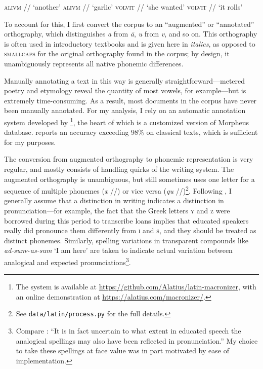\documentclass[12pt,twoside]{article}
\newcommand{\ipa}[1]{/\textipa{#1}/}
\begin{document}

\begin{exe}
\ex \textsc{alivm} \ipa{a.li.um} `another'
\ex \textsc{alivm} \ipa{a:.li.um} `garlic'
\ex \textsc{volvit} \ipa{wo.lu.it} `she wanted'
\ex \textsc{volvit} \ipa{wol.wit} `it rolls'
\end{exe}

To account for this, I first convert the corpus to an ``augmented'' or ``annotated'' orthography, which distinguishes \emph{a} from \emph{\=a}, \emph{u} from \emph{v}, and so on. This orthography is often used in introductory textbooks and is given here in \emph{italics}, as opposed to \textsc{smallcaps} for the original orthography found in the corpus; by design, it unambiguously represents all native phonemic differences.

Manually annotating a text in this way is generally straightforward---metered poetry and etymology reveal the quantity of most vowels, for example---but is extremely time-consuming. As a result, most documents in the corpus have never been manually annotated. For my analysis, I rely on an automatic annotation system developed by \citet{winge}\footnote{The system is available at \url{https://github.com/Alatius/latin-macronizer}, with an online demonstration at \url{https://alatius.com/macronizer/}.}, the heart of which is a customized version of  Morpheus database. \citet[27]{winge} reports an accuracy exceeding 98\% on classical texts, which is sufficient for my purposes.


The conversion from augmented orthography to phonemic representation is very regular, and mostly consists of handling quirks of the writing system. The augmented orthography is unambiguous, but still sometimes uses one letter for a sequence of multiple phonemes (\emph{x} \ipa{ks}) or vice versa (\emph{qu} \ipa{k\super{w}})\footnote{See \texttt{data/latin/process.py} for the full details.}. Following \citet{allen}, I generally assume that a distinction in writing indicates a distinction in pronunciation---for example, the fact that the Greek letters \textsc{y} and \textsc{z} were borrowed during this period to transcribe loans implies that educated speakers really did pronounce them differently from \textsc{i} and \textsc{s}, and they should be treated as distinct phonemes. Similarly, spelling variations in transparent compounds like \emph{ad-sum}\textasciitilde\emph{as-sum} `I am here' are taken to indicate actual variation between analogical and expected pronunciations\footnote{Compare \citet[22]{allen}: ``It is in fact uncertain to what extent in educated speech the analogical spellings may also have been reflected in pronunciation.'' My choice to take these spellings at face value was in part motivated by ease of implementation.}.
\end{document}

